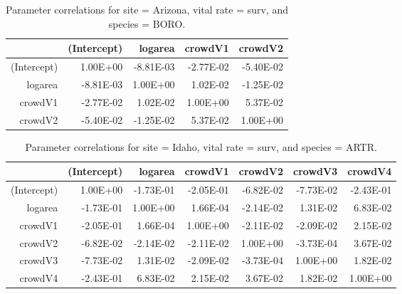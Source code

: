 \documentclass[12pt,]{article}
\begin{document}
\begin{table}[ht]
\centering
\caption{Parameter correlations for site = Arizona, vital rate = surv, and species = BORO.} 
\begin{tabular}{rrrrr}
  \hline
 & (Intercept) & logarea & crowdV1 & crowdV2 \\ 
  \hline
(Intercept) & 1.00E+00 & -8.81E-03 & -2.77E-02 & -5.40E-02 \\ 
  logarea & -8.81E-03 & 1.00E+00 & 1.02E-02 & -1.25E-02 \\ 
  crowdV1 & -2.77E-02 & 1.02E-02 & 1.00E+00 & 5.37E-02 \\ 
  crowdV2 & -5.40E-02 & -1.25E-02 & 5.37E-02 & 1.00E+00 \\ 
   \hline
\end{tabular}
\end{table}

\begin{table}[ht]
\centering
\caption{Parameter correlations for site = Idaho, vital rate = surv, and species = ARTR.} 
\begin{tabular}{rrrrrrr}
  \hline
 & (Intercept) & logarea & crowdV1 & crowdV2 & crowdV3 & crowdV4 \\ 
  \hline
(Intercept) & 1.00E+00 & -1.73E-01 & -2.05E-01 & -6.82E-02 & -7.73E-02 & -2.43E-01 \\ 
  logarea & -1.73E-01 & 1.00E+00 & 1.66E-04 & -2.14E-02 & 1.31E-02 & 6.83E-02 \\ 
  crowdV1 & -2.05E-01 & 1.66E-04 & 1.00E+00 & -2.11E-02 & -2.09E-02 & 2.15E-02 \\ 
  crowdV2 & -6.82E-02 & -2.14E-02 & -2.11E-02 & 1.00E+00 & -3.73E-04 & 3.67E-02 \\ 
  crowdV3 & -7.73E-02 & 1.31E-02 & -2.09E-02 & -3.73E-04 & 1.00E+00 & 1.82E-02 \\ 
  crowdV4 & -2.43E-01 & 6.83E-02 & 2.15E-02 & 3.67E-02 & 1.82E-02 & 1.00E+00 \\ 
   \hline
\end{tabular}
\end{table}

\newpage{}
\end{document}
